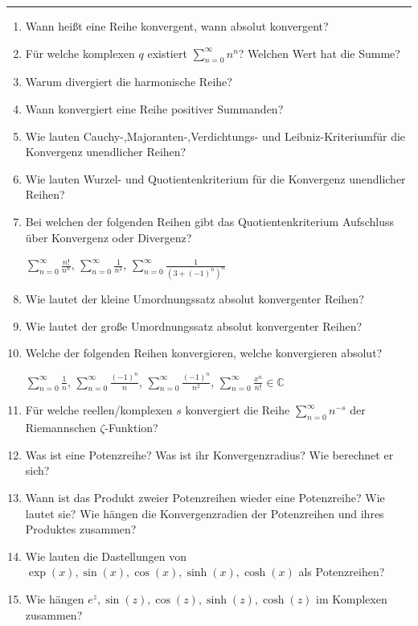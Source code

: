 \documentclass[11pt]{article}
\begin{document}
\Large




\medskip\hrule
\begin{enumerate}
    \item Wann heißt eine Reihe konvergent, wann absolut konvergent?
    \item  Für welche komplexen $q$ existiert $\sum_{n=0}^\infty {n^n}$? Welchen Wert hat die Summe?
    \item  Warum divergiert die harmonische Reihe?
    \item  Wann konvergiert eine Reihe positiver Summanden?
    \item  Wie lauten Cauchy-,Majoranten-,Verdichtungs- und Leibniz-Kriteriumfür die Konvergenz unendlicher Reihen?
    \item  Wie lauten Wurzel- und Quotientenkriterium für die Konvergenz unendlicher Reihen?
    \item  Bei welchen der folgenden Reihen gibt das Quotientenkriterium Aufschluss über Konvergenz oder Divergenz?
    \begin{center}
        $\sum_{n=0}^\infty \frac{n!}{n^n}$, $\sum_{n=0}^\infty \frac{1}{n^2}$, $\sum_{n=0}^\infty \frac{1}{(3+(-1)^n)^n}$
    \end{center}
    \item  Wie lautet der kleine Umordnungssatz absolut konvergenter Reihen?
    \item  Wie lautet der große Umordnungssatz absolut konvergenter Reihen?
    \item  Welche der folgenden Reihen konvergieren, welche konvergieren absolut?
    \begin{center}
        $\sum_{n=0}^\infty {\frac{1}{n}}$, $\sum_{n=0}^\infty \frac{(-1)^n}{n}$, $\sum_{n=0}^\infty \frac{(-1)^n}{n^2}$, $\sum_{n=0}^\infty \frac{x^n}{n!} \in \mathbb{C}$
    \end{center}
    \item  Für welche reellen/komplexen $s$ konvergiert die Reihe $\sum_{n=0}^\infty n^{-s}$ der Riemannschen
    $\zeta$-Funktion?
    \item  Was ist eine Potenzreihe? Was ist ihr Konvergenzradius? Wie berechnet er sich?
    \item  Wann ist das Produkt zweier Potenzreihen wieder eine Potenzreihe? Wie lautet sie? Wie hängen die Konvergenzradien der Potenzreihen und ihres Produktes zusammen?
    \item  Wie lauten die Dastellungen von $\exp(x), \sin(x), \cos(x), \sinh(x), \cosh(x)$ als Potenzreihen?
    \item  Wie hängen $e^z, \sin(z), \cos(z), \sinh(z), \cosh(z)$ im Komplexen zusammen?

\end{enumerate}
\end{document}
